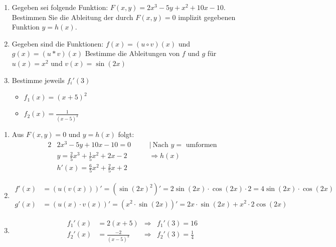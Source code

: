 \begin{enumerate}
	\item Gegeben sei folgende Funktion: $F(x,y)=2x^3-5y+x^2+10x-10$. Bestimmen Sie die Ableitung der durch $F(x,y)=0$ implizit gegebenen Funktion $y=h(x)$.
	\item Gegeben sind die Funktionen:
	$f(x) = (u \circ v)(x)$ und $g(x) = (u* v)(x)$
	Bestimme die Ableitungen von $f$ und $g$ für $u(x)=x^2$ und $v(x)=\sin(2x)$
	\item Bestimme jeweils $f_i'(3)$
	\begin{itemize}
		\item $f_1(x) = (x+5)^2$
		\item $f_2(x) = \frac{1}{(x-5)^2}$
	\end{itemize}
\end{enumerate}
\begin{lsg}{}
	\begin{enumerate}
		\item Aus $F(x,y)=0$ und $y=h(x)$ folgt:\begin{alignat*}{2}
		&2x^3-5y+10x-10=0\quad&&|\ \text{Nach $y=$ umformen}\\
		&y=\frac{2}{5} x^3+\frac{1}{5} x^2+2x-2 &&\Rightarrow h(x)\\
		&h'(x)=\frac{6}{5} x^2+\frac{2}{5}x+2
		\end{alignat*}
		\item \begin{align*}
		f'(x)&=\left(u(v(x))\right)'=\left({\sin(2x)}^2\right)'=2\sin(2x)\cdot \cos(2x) \cdot 2=4\sin(2x)\cdot \cos(2x)\\
		g'(x)&=(u(x)\cdot v(x))'=\left(x^2\cdot \sin(2x)\right)'=2x\cdot \sin(2x)+x^2\cdot 2\cos(2x)
		\end{align*}
		\item \begin{align*}
		f_1'(x)&=2(x+5)&\Rightarrow  &f_1'(3)=16\\
		f_2'(x)&=\frac{-2}{(x-5)^3}&\Rightarrow &f_2'(3)=\frac{1}{4}
		\end{align*}
	\end{enumerate}
\end{lsg}



